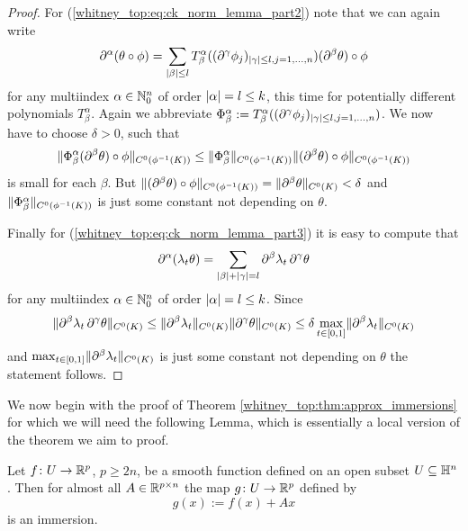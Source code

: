 \begin{proof}
    For (\ref{whitney_top:eq:ck_norm_lemma_part2}) note that we can again write 
    \[
    \partial^\alpha(\theta \circ \phi) = \sum_{\lvert\beta\rvert\leq l} T_\beta^\alpha((\partial^\gamma \phi_j)_{\lvert\gamma\rvert \leq l, j = 1,\ldots,n}) (\partial^\beta \theta) \circ \phi
    \]
    for any multiindex $\alpha \in \mathbb{N}_0^n$ of order $\lvert\alpha\rvert = l \leq k$, this time for potentially different polynomials $T_\beta^\alpha$. Again we abbreviate $\Phi_\beta^\alpha := T_\beta^\alpha((\partial^\gamma \phi_j)_{\lvert\gamma\rvert \leq l, j = 1,\ldots,n})$. We now have to choose $\delta >0$, such that  
    \[
    \lVert\Phi_\beta^\alpha (\partial^\beta \theta) \circ \phi\rVert_{C^0(\phi^{-1}(K))} \leq \lVert\Phi_\beta^\alpha\rVert_{C^0(\phi^{-1}(K))} \lVert(\partial^\beta \theta) \circ \phi\rVert_{C^0(\phi^{-1}(K))}  
    \]
    is small for each $\beta$. But $\lVert(\partial^\beta \theta) \circ \phi\rVert_{C^0(\phi^{-1}(K))} = \lVert\partial^\beta \theta\rVert_{C^0(K)}< \delta$ and $\lVert\Phi_\beta^\alpha\rVert_{C^0(\phi^{-1}(K))}$ is just some constant not depending on $\theta$.

    Finally for  (\ref{whitney_top:eq:ck_norm_lemma_part3}) it is easy to compute that 
    \[
    \partial^\alpha(\lambda_t \theta) = \sum_{\lvert\beta\rvert + \lvert\gamma\rvert = l} \partial^\beta \lambda_t \, \partial^\gamma \theta
    \]
    for any multiindex $\alpha \in \mathbb{N}_0^n$ of order $\lvert\alpha\rvert = l \leq k$. Since 
    \[
    \lVert\partial^\beta \lambda_t \, \partial^\gamma \theta\rVert_{C^0(K)} \leq \lVert\partial^\beta \lambda_t\rVert_{C^0(K)} \lVert\partial^\gamma \theta\rVert_{C^0(K)} \leq \delta \max_{t \in [0,1]} \lVert\partial^\beta \lambda_t\rVert_{C^0(K)}
    \]
    and $\max_{t \in [0,1]} \lVert\partial^\beta \lambda_t\rVert_{C^0(K)}$ is just some constant not depending on $\theta$ the statement follows.  
\end{proof}


We now begin with the proof of Theorem \ref{whitney_top:thm:approx_immersions} for which we will need the following Lemma, which is essentially a local version of the theorem we aim to proof. 

\begin{lemma}
    \label{whitney_top:lem:approx_immersions_lemma}
    Let $f \colon U \to \mathbb{R}^p$, $p \geq 2n$, be a smooth function defined on an open subset $U \subseteq \mathbb{H}^n$. Then for almost all $A \in \mathbb{R}^{p \times n}$ the map $g \colon U \to \mathbb{R}^p$ defined by 
    \[
    g(x) := f(x) + Ax
    \] 
    is an immersion.
\end{lemma}

